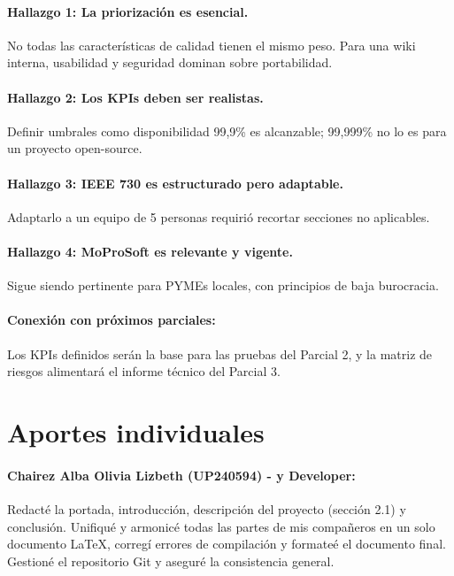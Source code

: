 \documentclass[12pt]{article}
\begin{document}
\paragraph{Hallazgo 1: La priorización es esencial.} No todas las características de calidad tienen el mismo peso. Para una wiki interna, usabilidad y seguridad dominan sobre portabilidad.

\paragraph{Hallazgo 2: Los KPIs deben ser realistas.} Definir umbrales como disponibilidad 99,9\% es alcanzable; 99,999\% no lo es para un proyecto open-source.

\paragraph{Hallazgo 3: IEEE 730 es estructurado pero adaptable.} Adaptarlo a un equipo de 5 personas requirió recortar secciones no aplicables.

\paragraph{Hallazgo 4: MoProSoft es relevante y vigente.} Sigue siendo pertinente para PYMEs locales, con principios de baja burocracia.

\paragraph{Conexión con próximos parciales:} Los KPIs definidos serán la base para las pruebas del Parcial 2, y la matriz de riesgos alimentará el informe técnico del Parcial 3.

\newpage
\section{Aportes individuales}

\paragraph{Chairez Alba Olivia Lizbeth (UP240594) -  y Developer:}
Redacté la portada, introducción, descripción del proyecto (sección 2.1) y conclusión. Unifiqué y armonicé todas las partes de mis compañeros en un solo documento LaTeX, corregí errores de compilación y formateé el documento final. Gestioné el repositorio Git y aseguré la consistencia general.
\end{document}
